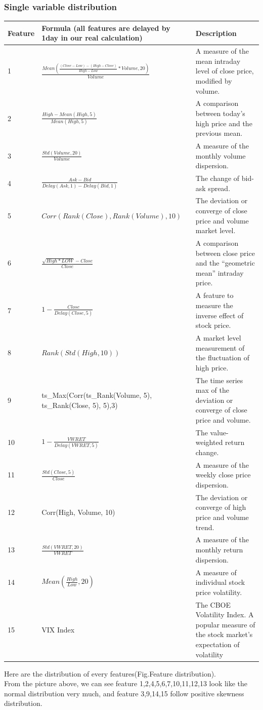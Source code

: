\documentclass{article}
\begin{document}
\subsubsection{Single variable distribution}  
\begin{center}
\begin{tabular}{m{1cm}<{\centering}|m{8cm}<{\centering}|m{8cm}<{\centering}}
Feature & Formula (all features are delayed by 1day in our real calculation) & Description \\
\hline
1 & $\frac{Mean(\frac{(Close-Low)-(High-Close)}{High-Low}*Volume, 20)}{Volume}$ & A measure of the mean intraday level of close price, modified by volume. \\
\hline
2 & $\frac{High-Mean(High,5)}{Mean(High,5)}$ & A comparison between today's high price and the previous mean.  \\
\hline
3 & $\frac{Std(Volume,20)}{Volume}$ & A measure of the monthly volume dispersion.  \\
\hline
4 & $\frac{Ask-Bid}{Delay(Ask,1)-Delay(Bid, 1)}$ & The change of bid-ask spread.\\
\hline
5 & $Corr(Rank(Close), Rank(Volume), 10)$ & The deviation or converge of close price and volume market level. \\
\hline
6 & $\frac{\sqrt{High * LOW} - Close}{Close}$ & A comparison between close price and the “geometric mean” intraday price.  \\
\hline
7 & $1-\frac{Close}{Delay(Close, 5)}$ & A feature to measure the inverse effect of stock price. \\
\hline
8 & $Rank(Std(High, 10))$  & A market level measurement of the fluctuation of high price.\\
\hline
9 & ts\_Max(Corr(ts\_Rank(Volume, 5), ts\_Rank(Close, 5), 5),3) & The time series max of the deviation or converge of close price and volume.\\
\hline
10 & $1-\frac{VWRET}{Delay(VWRET, 5)}$& The value-weighted return change. \\
\hline
11 & $\frac{Std(Close, 5)}{Close}$ & A measure of the weekly close price dispersion. \\
\hline
12 & Corr(High, Volume, 10) & The deviation or converge of high price and volume trend. \\
\hline
13 & $\frac{Std(VWRET, 20)}{VWRET}$ & A measure of the monthly return dispersion. \\
\hline
14 & $Mean(\frac{High}{Low}, 20)$ & A measure of individual stock price volatility.\\
\hline
15 & VIX Index & The CBOE Volatility Index. A popular measure of the stock market's expectation of volatility
\end{tabular}
\end{center}
Here are the distribution of every features(Fig.Feature distribution).  \\
From the picture above, we can see feature 1,2,4,5,6,7,10,11,12,13 look like the normal distribution very much, and feature 3,9,14,15 follow positive skewness distribution. 
\end{document}
